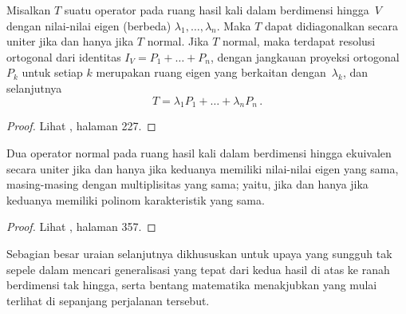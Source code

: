 \begin{thm}\label{00017}
Misalkan $T$ suatu operator pada ruang hasil kali dalam berdimensi hingga~$V$ dengan nilai-nilai eigen (berbeda)
$\lambda_1, \dots, \lambda_n$. Maka $T$ dapat didiagonalkan secara uniter jika dan
hanya jika $T$ normal. Jika $T$ normal, maka terdapat resolusi ortogonal dari identitas
$I_V = P_1 + \dots + P_n$, dengan jangkauan proyeksi ortogonal $P_k$ untuk setiap $k$
merupakan ruang eigen yang berkaitan dengan~$\lambda_k$, dan selanjutnya
     \[ T = \lambda_1P_1 +\dots + \lambda_nP_n\,. \]
\end{thm}

\begin{proof} Lihat \cite{Roman:2005}, halaman 227. \ns
\end{proof}

\begin{thm}\label{00018} Dua operator normal pada ruang hasil kali dalam berdimensi hingga
ekuivalen secara uniter jika dan hanya jika keduanya memiliki nilai-nilai eigen yang sama,
masing-masing dengan multiplisitas yang sama; yaitu, jika dan hanya jika keduanya memiliki
polinom karakteristik yang sama.
\end{thm}

\begin{proof} Lihat \cite{HoffmanK:1971}, halaman 357. \ns
\end{proof}

Sebagian besar uraian selanjutnya dikhususkan untuk upaya yang sungguh tak sepele dalam mencari
generalisasi yang tepat dari kedua hasil di atas ke ranah berdimensi tak hingga, serta bentang
matematika menakjubkan yang mulai terlihat di sepanjang perjalanan tersebut.


